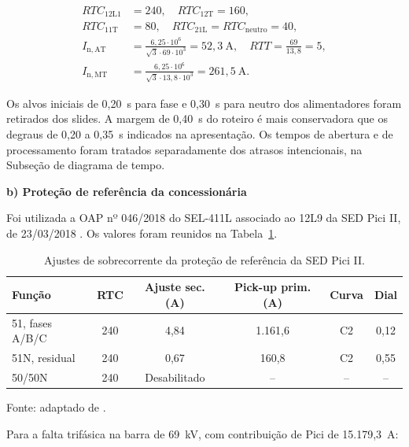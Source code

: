 \begin{equation}
    \begin{aligned}
        RTC_{\mathrm{12L1}}&=240,\quad RTC_{\mathrm{12T}}=160,\\
        RTC_{\mathrm{11T}}&=80,\quad RTC_{\mathrm{21L}}=RTC_{\mathrm{neutro}}=40,\\
        I_{\mathrm{n,AT}}&=\frac{6{,}25\cdot10^6}{\sqrt{3}\cdot69\cdot10^3}
            =52{,}3~\mathrm{A},\quad RTT=\frac{69}{13{,}8}=5,\\
        I_{\mathrm{n,MT}}&=\frac{6{,}25\cdot10^6}{\sqrt{3}\cdot13{,}8\cdot10^3}
            =261{,}5~\mathrm{A}.
    \end{aligned}
    \label{eq:oc_nominais}
\end{equation}

Os alvos iniciais de 0,20~s para fase e 0,30~s para neutro dos alimentadores foram retirados dos slides. A margem de 0,40~s do roteiro é mais conservadora que os degraus de 0,20 a 0,35~s indicados na apresentação. Os tempos de abertura e de processamento foram tratados separadamente dos atrasos intencionais, na Subseção de diagrama de tempo.

\textbf{b) Proteção de referência da concessionária}

Foi utilizada a OAP nº 046/2018 do SEL-411L associado ao 12L9 da SED Pici II, de 23/03/2018 \cite{enel2018oap}. Os valores foram reunidos na Tabela~\ref{tab:oc_oap_pci}.

\begin{table}[htbp]
    \centering
    \caption{Ajustes de sobrecorrente da proteção de referência da SED Pici II.}
    \label{tab:oc_oap_pci}
    \begin{tabular}{lccccc}
        \hline
        \textbf{Função} & \textbf{RTC} & \textbf{Ajuste sec. (A)} & \textbf{Pick-up prim. (A)} & \textbf{Curva} & \textbf{Dial}\\
        \hline
        51, fases A/B/C & 240 & 4,84 & 1.161,6 & C2 & 0,12\\
        51N, residual & 240 & 0,67 & 160,8 & C2 & 0,55\\
        50/50N & 240 & Desabilitado & -- & -- & --\\
        \hline
    \end{tabular}
    \par\vspace{2pt}
    {\small Fonte: adaptado de \cite{enel2018oap}.}
\end{table}

Para a falta trifásica na barra de 69~kV, com contribuição de Pici de 15.179,3~A:

